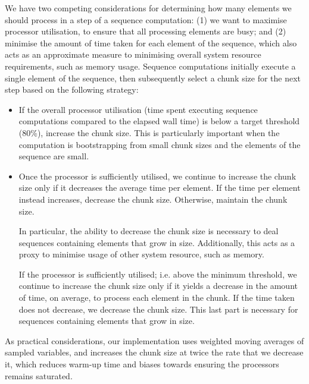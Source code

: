 We have two competing considerations for determining how many elements we should
process in a step of a sequence computation: (1) we want to maximise processor
utilisation, to ensure that all processing elements are busy; and (2) minimise
the amount of time taken for each element of the sequence, which also acts as an
approximate measure to minimising overall system resource requirements, such as
memory usage. Sequence computations initially execute a single element of the
sequence, then subsequently select a chunk size for the next step based on the
following strategy:
%
\begin{itemize}
  \item If the overall processor utilisation (time spent executing sequence
    computations compared to the elapsed wall time) is below a target threshold
    (80\%), increase the chunk size.
    This is particularly important when the computation is bootstrapping from
    small chunk sizes and the elements of the sequence are small.

  \item Once the processor is sufficiently utilised, we continue to increase the
    chunk size only if it decreases the average time per element. If the time
    per element instead increases, decrease the chunk size. Otherwise, maintain
    the chunk size.

    In particular, the ability to decrease the chunk size is
    necessary to deal sequences containing elements that grow in size.
    Additionally, this acts as a proxy to minimise usage of other system
    resource, such as memory.

    If the processor is sufficiently utilised; i.e. above the minimum
    threshold, we continue to increase the chunk size only if it yields a decrease
    in the amount of time, on average, to process each element in the chunk. If
    the time taken does not decrease, we decrease the chunk size. This last
    part is necessary for sequences containing elements that grow in size.

\end{itemize}
%
As practical considerations, our implementation uses weighted moving averages of
sampled variables, and increases the chunk size at twice the rate that we
decrease it, which reduces warm-up time and biases towards ensuring the
processors remains saturated.

\endinput



